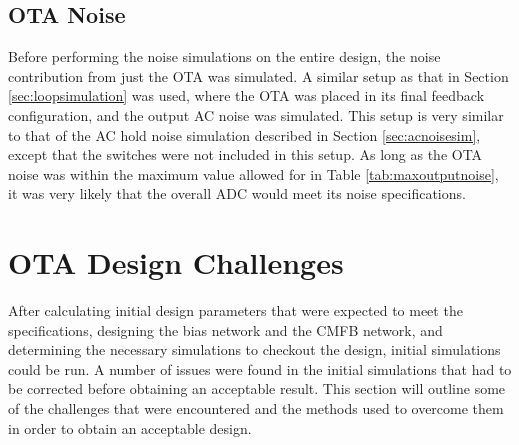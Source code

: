 \subsection{OTA Noise}
Before performing the noise simulations on the entire design, the noise contribution from just the OTA was simulated. A similar setup as that in Section \ref{sec:loopsimulation} was used, where the OTA was placed in its final feedback configuration, and the output AC noise was simulated. This setup is very similar to that of the AC hold noise simulation described in Section \ref{sec:acnoisesim}, except that the switches were not included in this setup. As long as the OTA noise was within the maximum value allowed for in Table \ref{tab:maxoutputnoise}, it was very likely that the overall ADC would meet its noise specifications.
\section{OTA Design Challenges}
After calculating initial design parameters that were expected to meet the specifications, designing the bias network and the CMFB network, and determining the necessary simulations to checkout the design, initial simulations could be run. A number of issues were found in the initial simulations that had to be corrected before obtaining an acceptable result. This section will outline some of the challenges that were encountered and the methods used to overcome them in order to obtain an acceptable design.

